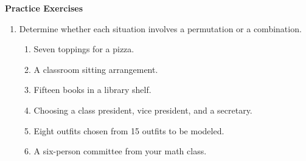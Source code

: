 \textbf{Practice Exercises}

\vspce

\begin{enumerate}[label = \Alph*. ]
\item \hspce Determine whether each situation involves a permutation or a combination.
\begin{enumerate}[label = \arabic*. ]
\item Seven toppings for a pizza. 
\item A classroom sitting arrangement. 
\item Fifteen  books in a library shelf. 
\item Choosing a class president, vice president, and a secretary. 
\item Eight outfits chosen from 15 outfits to be modeled. 
\item A six-person committee from your math class. 

\end{enumerate}   


\end{enumerate}  

